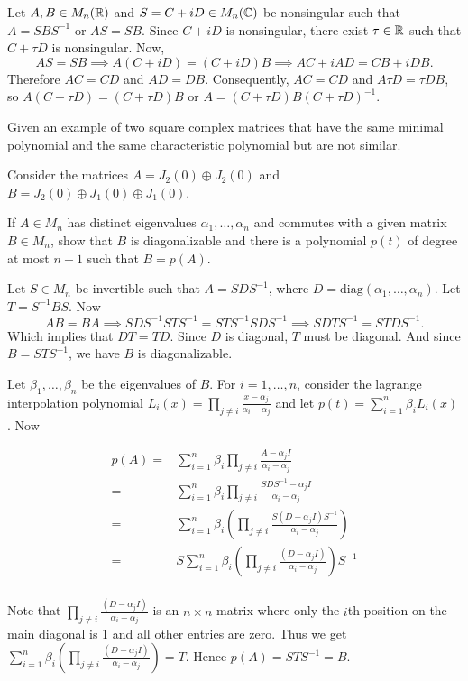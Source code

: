 \begin{solution}
    Let $A,B\in M_n(\mathbb{R})$ and $S=C+iD\in M_n(\mathbb{C})$ be nonsingular such that $A=SBS^{-1}$ or $AS=SB$. Since $C+iD$ is nonsingular, there exist $\tau\in\mathbb{R}$ such that $C+\tau D$ is nonsingular. Now,
    $$AS=SB\implies A(C+iD)=(C+iD)B\implies AC+iAD=CB+iDB.$$
    Therefore $AC=CD$ and $AD=DB$. Consequently, $AC=CD$ and $A\tau D=\tau DB$, so $A(C+\tau D)=(C+\tau D)B$ or $A=(C+\tau D)B(C+\tau D)^{-1}$.
\end{solution}
\question Given an example of two square complex matrices that have the same minimal polynomial and the same characteristic polynomial but are not similar.

\begin{solution}
    Consider the matrices $A=J_2(0)\oplus J_2(0)$ and $B=J_2(0)\oplus J_1(0)\oplus J_1(0)$.
\end{solution}

\question If $A\in M_n$ has distinct eigenvalues $\alpha_1, \ldots, \alpha_n$ and commutes with a given matrix $B\in M_n$, show that $B$ is diagonalizable and there is a polynomial $p(t)$ of degree at most $n-1$ such that $B=p(A)$.

\begin{solution}
    Let $S\in M_n$ be invertible such that $A=SDS^{-1}$, where $D=\text{diag}(\alpha_1, \ldots, \alpha_n)$. Let $T=S^{-1}BS$. Now 
    $$AB=BA \implies SDS^{-1}STS^{-1}=STS^{-1}SDS^{-1} \implies SDTS^{-1}=STDS^{-1}.$$
    Which implies that $DT=TD$. Since $D$ is diagonal, $T$ must be diagonal. And since $B=STS^{-1}$, we have $B$ is diagonalizable.  

    Let $\beta_1, \ldots, \beta_n$ be the eigenvalues of $B$. For $i=1, \ldots, n$, consider the lagrange interpolation polynomial $L_i(x)=\displaystyle\prod_{j\neq i}\frac{x-\alpha_j}{\alpha_i-\alpha_j}$ and let $p(t)=\displaystyle\sum_{i=1}^{n}{\beta_i L_i(x)}$. Now

    \begin{align*}
        p(A)=&\sum_{i=1}^{n}{\beta_i\prod_{j\neq i}\frac{A-\alpha_jI}{\alpha_i-\alpha_j}}\\
        =&\sum_{i=1}^{n}{\beta_i\prod_{j\neq i}\frac{SDS^{-1}-\alpha_jI}{\alpha_i-\alpha_j}}\\
        =&\sum_{i=1}^{n}{\beta_i\left(\prod_{j\neq i}\frac{S(D-\alpha_jI)S^{-1}}{\alpha_i-\alpha_j}\right)}\\
        =&S\sum_{i=1}^{n}{\beta_i\left(\prod_{j\neq i}\frac{(D-\alpha_jI)}{\alpha_i-\alpha_j}\right)}S^{-1}\\
    \end{align*} 

    Note that $\prod_{j\neq i}{\frac{(D-\alpha_jI)}{\alpha_i-\alpha_j}}$ is an $n\times n$ matrix where only the $i$th position on the main diagonal is 1 and all other entries are zero. Thus we get $\sum_{i=1}^{n}{\beta_i\left(\prod_{j\neq i}\frac{(D-\alpha_jI)}{\alpha_i-\alpha_j}\right)}=T$. Hence $p(A)=STS^{-1}=B$.
\end{solution}

